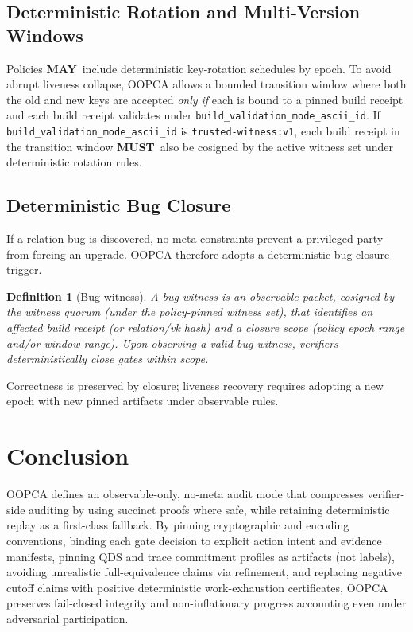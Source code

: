 \documentclass[11pt]{article}
\newcommand{\MUST}{\textbf{MUST}}
\newcommand{\MAY}{\textbf{MAY}}
\newtheorem{definition}{Definition}
\begin{document}
\subsection{Deterministic Rotation and Multi-Version Windows}

Policies \MAY\ include deterministic key-rotation schedules by epoch. To avoid abrupt liveness collapse, OOPCA allows a bounded transition window where both the old and new keys are accepted \emph{only if} each is bound to a pinned build receipt and each build receipt validates under \texttt{build\_validation\_mode\_ascii\_id}.
If \texttt{build\_validation\_mode\_ascii\_id} is \texttt{trusted-witness:v1}, each build receipt in the transition window \MUST\ also be cosigned by the active witness set under deterministic rotation rules.

\subsection{Deterministic Bug Closure}

If a relation bug is discovered, no-meta constraints prevent a privileged party from forcing an upgrade. OOPCA therefore adopts a deterministic bug-closure trigger.

\begin{definition}[Bug witness]
A bug witness is an observable packet, cosigned by the witness quorum (under the policy-pinned witness set), that identifies an affected build receipt (or relation/vk hash) and a closure scope (policy epoch range and/or window range). Upon observing a valid bug witness, verifiers deterministically close gates within scope.
\end{definition}

Correctness is preserved by closure; liveness recovery requires adopting a new epoch with new pinned artifacts under observable rules.

\section{Conclusion}

OOPCA defines an observable-only, no-meta audit mode that compresses verifier-side auditing by using succinct proofs where safe, while retaining deterministic replay as a first-class fallback. By pinning cryptographic and encoding conventions, binding each gate decision to explicit action intent and evidence manifests, pinning QDS and trace commitment profiles as artifacts (not labels), avoiding unrealistic full-equivalence claims via refinement, and replacing negative cutoff claims with positive deterministic work-exhaustion certificates, OOPCA preserves fail-closed integrity and non-inflationary progress accounting even under adversarial participation.
\end{document}
